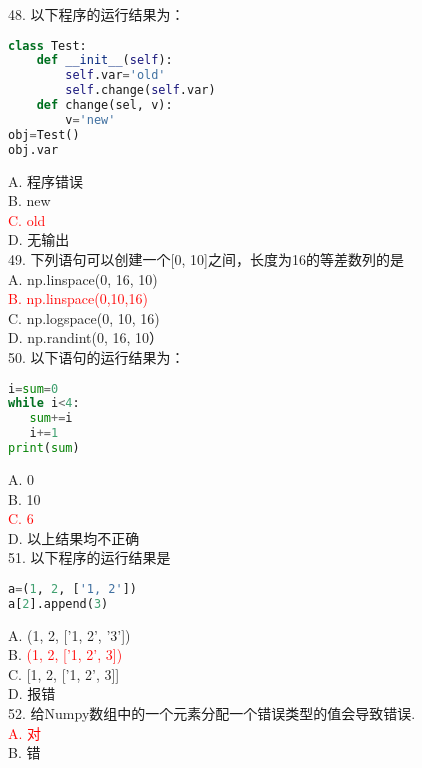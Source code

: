 \documentclass[6pt]{article}
\begin{document}
48. 以下程序的运行结果为：\\

\begin{lstlisting}[language=Python]
class Test:
    def __init__(self):
        self.var='old'
        self.change(self.var)
    def change(sel, v):
        v='new'
obj=Test()
obj.var
\end{lstlisting}

A. 程序错误\\
B. new\\
\textcolor{red}{C. old}\\
D. 无输出\\

49. 下列语句可以创建一个[0, 10]之间，长度为16的等差数列的是\\

A. np.linspace(0, 16, 10)\\
\textcolor{red}{B. np.linspace(0,10,16)}\\
C. np.logspace(0, 10, 16)\\
D. np.randint(0, 16, 10）\\

50. 以下语句的运行结果为：\\

\begin{lstlisting}[language=Python]
i=sum=0
while i<4:
   sum+=i
   i+=1
print(sum)
\end{lstlisting}
A. 0\\
B. 10\\
\textcolor{red}{C. 6}\\
D. 以上结果均不正确\\

51. 以下程序的运行结果是\\

\begin{lstlisting}[language=Python]
a=(1, 2, ['1, 2'])
a[2].append(3)
\end{lstlisting}

A. (1, 2, ['1, 2', '3'])\\
B. \textcolor{red}{(1, 2, ['1, 2', 3])}\\
C. [1, 2, ['1, 2', 3]]\\
D. 报错\\

52. 给Numpy数组中的一个元素分配一个错误类型的值会导致错误.\\

\textcolor{red}{A. 对}\\
B. 错\\
\end{document}
